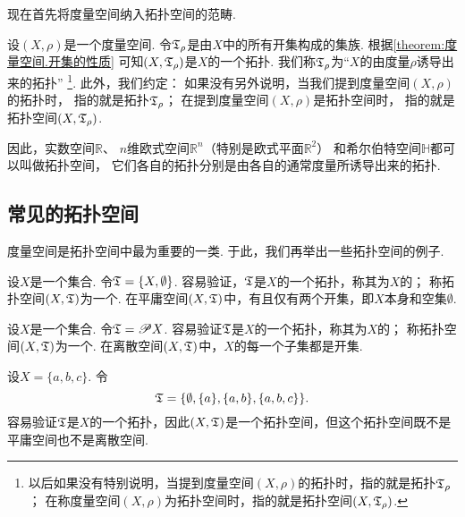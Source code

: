 现在首先将度量空间纳入拓扑空间的范畴.

设\((X,\rho)\)是一个度量空间.
令\(\mathfrak T_\rho\)是由\(X\)中的所有开集构成的集族.
根据\cref{theorem:度量空间.开集的性质} 可知\((X,\mathfrak T_\rho)\)是\(X\)的一个拓扑.
我们称\(\mathfrak T_\rho\)为“\(X\)的由度量\(\rho\)诱导出来的拓扑”
\footnote{%
以后如果没有特别说明，当提到度量空间\((X,\rho)\)的拓扑时，指的就是拓扑\(\mathfrak T_\rho\)；
在称度量空间\((X,\rho)\)为拓扑空间时，指的就是拓扑空间\((X,\mathfrak T_\rho)\).
}.
此外，我们约定：
如果没有另外说明，当我们提到度量空间\((X,\rho)\)的拓扑时，
指的就是拓扑\(\mathfrak T_\rho\)；
在提到度量空间\((X,\rho)\)是拓扑空间时，
指的就是拓扑空间\((X,\mathfrak T_\rho)\).

因此，实数空间\(\mathbb{R}\)、
\(n\)维欧式空间\(\mathbb{R}^n\)（特别是欧式平面\(\mathbb{R}^2\)）
和希尔伯特空间\(\mathbb{H}\)都可以叫做拓扑空间，
它们各自的拓扑分别是由各自的通常度量所诱导出来的拓扑.

\subsection{常见的拓扑空间}
度量空间是拓扑空间中最为重要的一类.
于此，我们再举出一些拓扑空间的例子.

\begin{example}[平庸空间]
设\(X\)是一个集合.
令\(\mathfrak T=\{X,\emptyset\}\).
容易验证，\(\mathfrak T\)是\(X\)的一个拓扑，称其为\(X\)的；
称拓扑空间\((X,\mathfrak T)\)为一个.
在平庸空间\((X,\mathfrak T)\)中，有且仅有两个开集，即\(X\)本身和空集\(\emptyset\).
\end{example}

\begin{example}[离散空间]
设\(X\)是一个集合.
令\(\mathfrak T=\mathscr{P} X\).
容易验证\(\mathfrak T\)是\(X\)的一个拓扑，称其为\(X\)的；
称拓扑空间\((X,\mathfrak T)\)为一个.
在离散空间\((X,\mathfrak T)\)中，\(X\)的每一个子集都是开集.
\end{example}

\begin{example}\label{example:拓扑学.常见的拓扑空间3}
设\(X = \{a,b,c\}\).
令\[
\mathfrak T = \{
	\emptyset,
	\{a\},
	\{a,b\},
	\{a,b,c\}
\}.
\]
容易验证\(\mathfrak T\)是\(X\)的一个拓扑，因此\((X,\mathfrak T)\)是一个拓扑空间，但这个拓扑空间既不是平庸空间也不是离散空间.
\end{example}

